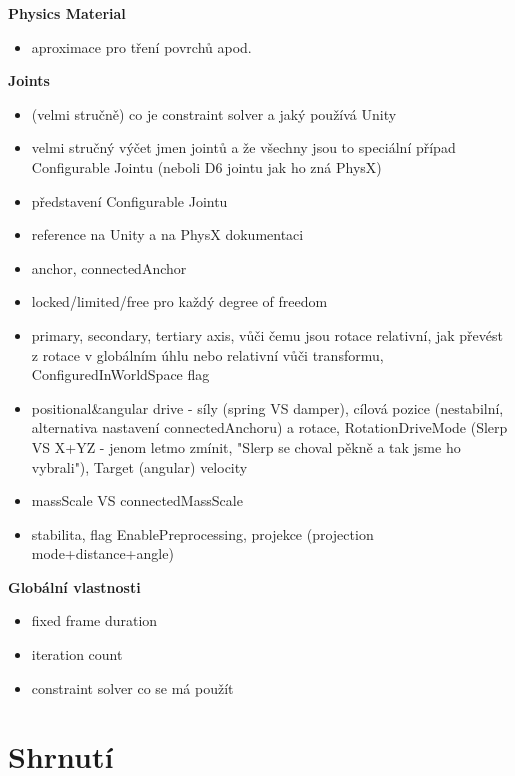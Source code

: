 \textbf{Physics Material}
\begin{itemize}
    \item aproximace pro tření povrchů apod.
\end{itemize}

\textbf{Joints}
\begin{itemize}
    \item (velmi stručně) co je constraint solver a jaký používá Unity
    \item velmi stručný výčet jmen jointů a že všechny jsou to speciální případ Configurable Jointu (neboli D6 jointu jak ho zná PhysX)
    \item představení Configurable Jointu
    \item reference na Unity a na PhysX dokumentaci
    \item anchor, connectedAnchor
    \item locked/limited/free pro každý degree of freedom
    \item primary, secondary, tertiary axis, vůči čemu jsou rotace relativní, jak převést z rotace v globálním úhlu nebo relativní vůči transformu, ConfiguredInWorldSpace flag
    \item positional\&angular drive - síly (spring VS damper), cílová pozice (nestabilní, alternativa nastavení connectedAnchoru) a rotace, RotationDriveMode (Slerp VS X+YZ - jenom letmo zmínit, "Slerp se choval pěkně a tak jsme ho vybrali"), Target (angular) velocity
    \item massScale VS connectedMassScale
    \item stabilita, flag EnablePreprocessing, projekce (projection mode+distance+angle)
\end{itemize}

\textbf{Globální vlastnosti}
\begin{itemize}
    \item fixed frame duration
    \item iteration count
    \item constraint solver co se má použít
\end{itemize}


\section{Shrnutí}